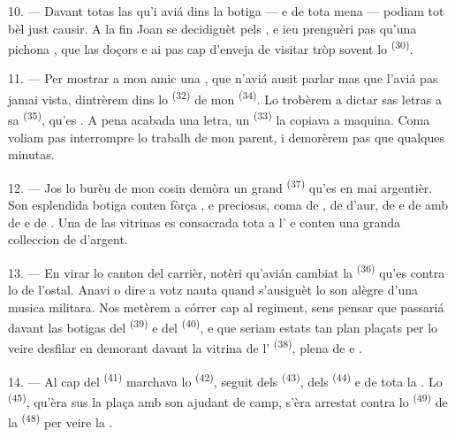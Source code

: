 10. --- Davant totas las  qu'i aviá dins la botiga ---
 e  de tota mena ---
podiam tot bèl just causir. A la fin Joan se decidiguèt pels , e ieu prenguèri pas qu'una pichona , que las
doçors  e ai pas cap d'enveja de visitar tròp sovent
lo  \textsuperscript{(30)}.

\VUsaut{3.0mm}

11. --- Per mostrar a mon amic una , que n'aviá
ausit parlar mas que l'aviá pas jamai vista, dintrèrem dins lo 
\textsuperscript{(32)} de mon  \textsuperscript{(34)}. Lo trobèrem a
dictar sas letras a sa  \textsuperscript{(35)}, qu'es
. A pena acabada una letra, un 
\textsuperscript{(33)} la copiava a maquina. Coma voliam pas interrompre lo
trabalh de mon parent, i demorèrem pas que qualques minutas.

12. --- Jos lo burèu de mon cosin demòra un grand 
\textsuperscript{(37)} qu'es en mai argentièr. Son esplendida botiga conten fòrça
,  e
 preciosas, coma de , de
 d'aur, de  e de  amb de
 e de . Una de las vitrinas es
consacrada tota a l' e conten una granda colleccion de
 d'argent.

13. --- En virar lo canton del carrièr, notèri qu'avián cambiat la 
\textsuperscript{(36)} qu'es contra lo  de l'ostal. Anavi o dire a
votz nauta quand s'ausiguèt lo son alègre d'una musica militara. Nos metèrem a
córrer cap al regiment, sens pensar que passariá davant las botigas del
 \textsuperscript{(39)} e del 
\textsuperscript{(40)}, e que seriam estats tan plan plaçats per lo veire desfilar
en demorant davant la vitrina de l' \textsuperscript{(38)},
plena de  e .

\VUsaut{3.0mm}

14. --- Al cap del  \textsuperscript{(41)} marchava lo
 \textsuperscript{(42)}, seguit dels 
\textsuperscript{(43)}, dels  \textsuperscript{(44)} e de tota la
. Lo  \textsuperscript{(45)}, qu'èra sus la plaça
amb son ajudant de camp, s'èra arrestat contra lo 
\textsuperscript{(49)} de la  \textsuperscript{(48)} per veire la
.

